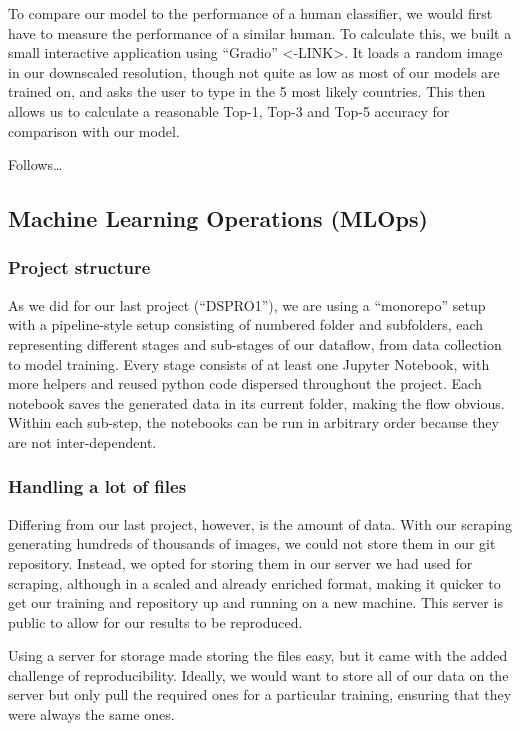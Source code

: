 To compare our model to the performance of a human classifier, we would
first have to measure the performance of a similar human. To calculate
this, we built a small interactive application using ``Gradio''
\textless-LINK\textgreater. It loads a random image in our downscaled
resolution, though not quite as low as most of our models are trained
on, and asks the user to type in the 5 most likely countries. This then
allows us to calculate a reasonable Top-1, Top-3 and Top-5 accuracy for
comparison with our model.

Follows\ldots{}

\subsection{Machine Learning Operations
(MLOps)}\label{machine-learning-operations-mlops}

\subsubsection{Project structure}\label{project-structure}

As we did for our last project (``DSPRO1''), we are using a ``monorepo''
setup with a pipeline-style setup consisting of numbered folder and
subfolders, each representing different stages and sub-stages of our
dataflow, from data collection to model training. Every stage consists
of at least one Jupyter Notebook, with more helpers and reused python
code dispersed throughout the project. Each notebook saves the generated
data in its current folder, making the flow obvious. Within each
sub-step, the notebooks can be run in arbitrary order because they are
not inter-dependent.

\subsubsection{Handling a lot of files}\label{handling-a-lot-of-files}

Differing from our last project, however, is the amount of data. With
our scraping generating hundreds of thousands of images, we could not
store them in our git repository. Instead, we opted for storing them in
our server we had used for scraping, although in a scaled and already
enriched format, making it quicker to get our training and repository up
and running on a new machine. This server is public to allow for our
results to be reproduced.

Using a server for storage made storing the files easy, but it came with
the added challenge of reproducibility. Ideally, we would want to store
all of our data on the server but only pull the required ones for a
particular training, ensuring that they were always the same ones.

